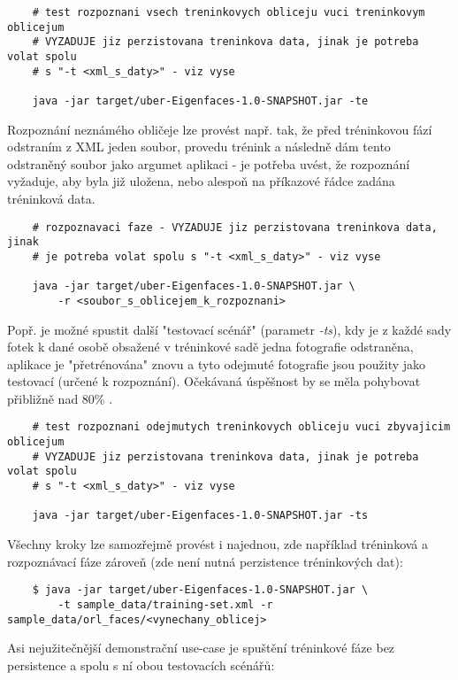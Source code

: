 \documentclass[10pt,a4paper]{article}
\begin{document}
	\begin{verbatim} 
    # test rozpoznani vsech treninkovych obliceju vuci treninkovym oblicejum
    # VYZADUJE jiz perzistovana treninkova data, jinak je potreba volat spolu 
    # s "-t <xml_s_daty>" - viz vyse
    
    java -jar target/uber-Eigenfaces-1.0-SNAPSHOT.jar -te
	\end{verbatim}
	
Rozpoznání neznámého obličeje lze provést např. tak, že před tréninkovou fází odstraním z XML jeden soubor, provedu trénink a následně dám tento odstraněný soubor jako argumet aplikaci - je potřeba uvést, že rozpoznání vyžaduje, aby byla již uložena, nebo alespoň na příkazové řádce zadána tréninková data.

	\begin{verbatim} 
    # rozpoznavaci faze - VYZADUJE jiz perzistovana treninkova data, jinak 
    # je potreba volat spolu s "-t <xml_s_daty>" - viz vyse
    
    java -jar target/uber-Eigenfaces-1.0-SNAPSHOT.jar \
    	-r <soubor_s_oblicejem_k_rozpoznani>
	\end{verbatim}	

Popř. je možné spustit další "testovací scénář" (parametr \textit{-ts}), kdy je z každé sady fotek k dané osobě obsažené v tréninkové sadě jedna fotografie odstraněna, aplikace je "přetrénována" znovu a tyto odejmuté fotografie jsou použity jako testovací (určené k rozpoznání). Očekávaná úspěšnost by se měla pohybovat přibližně nad 80\% \cite{jafri}.

	\begin{verbatim}
	# test rozpoznani odejmutych treninkovych obliceju vuci zbyvajicim oblicejum
	# VYZADUJE jiz perzistovana treninkova data, jinak je potreba volat spolu 
	# s "-t <xml_s_daty>" - viz vyse
	
    java -jar target/uber-Eigenfaces-1.0-SNAPSHOT.jar -ts
	\end{verbatim}	
	
Všechny kroky lze samozřejmě provést i najednou, zde například tréninková a rozpoznávací fáze zároveň (zde není nutná perzistence tréninkových dat):
	
	\begin{verbatim}
    $ java -jar target/uber-Eigenfaces-1.0-SNAPSHOT.jar \
    	-t sample_data/training-set.xml -r sample_data/orl_faces/<vynechany_oblicej>
    \end{verbatim}

Asi nejužitečnější demonstrační use-case je spuštění tréninkové fáze bez persistence a spolu s ní obou testovacích scénářů:
\end{document}
